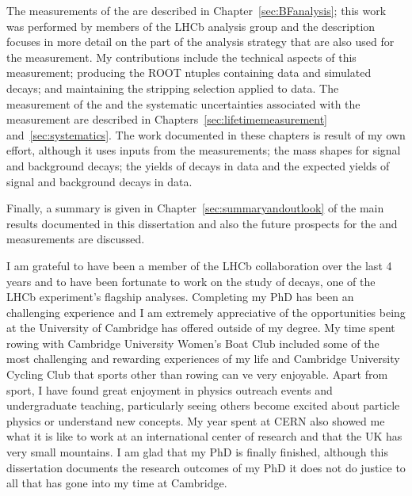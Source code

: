 The measurements of the \bmumu \BFs are described in Chapter~\ref{sec:BFanalysis}; this work was performed by members of the \bmumu LHCb analysis group and the description focuses in more detail on the part of the analysis strategy that are also used for the \el measurement. My contributions include the technical aspects of this measurement; producing the ROOT ntuples containing data and simulated decays; and maintaining the stripping selection applied to data. 
The measurement of the \bsmumu \el and the systematic uncertainties associated with the measurement are described in Chapters~\ref{sec:lifetimemeasurement} and~\ref{sec:systematics}. 
The work documented in these chapters is result of my own effort, although it uses inputs from the \BF measurements; the mass shapes for signal and background decays; the yields of \bsjpsiphi decays in data and the expected yields of signal and background decays in data. %

Finally, a summary is given in Chapter~\ref{sec:summaryandoutlook} of the main results documented in this dissertation and also the future prospects for the \BF and \el measurements are discussed. 

I am grateful to have been a member of the LHCb collaboration over the last 4 years and to have been fortunate to work on the study of \bmumu decays, one of the LHCb experiment's flagship analyses. Completing my PhD has been an challenging experience and I am extremely appreciative of the opportunities being at the University of Cambridge has offered outside of my degree. My time spent rowing with Cambridge University Women's Boat Club included some of the most challenging and rewarding experiences of my life and Cambridge University Cycling Club that sports other than rowing can ve very enjoyable. %
Apart from sport, I have found great enjoyment in physics outreach events and undergraduate teaching, particularly seeing others become excited about particle physics or understand new concepts. My year spent at CERN also showed me what it is like to work at an international center of research and that the UK has very small mountains. I am glad that my PhD is finally finished, although this dissertation documents the research outcomes of my PhD it does not do justice to all that has gone into my time at Cambridge.
